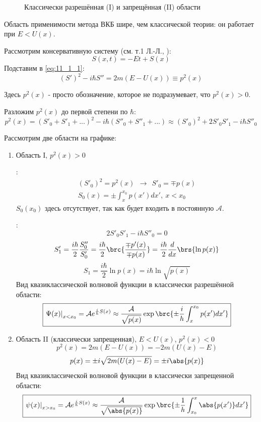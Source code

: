 \begin{figure}
\centering
{}
\caption{Классически разрешённая (I) и запрещённая (II) области} \label{fig:1}
\end{figure}

Область применимости метода ВКБ шире, чем классической теории: он работает при $E < U(x)$.

Рассмотрим консервативную систему (см. т.1 Л.-Л., ):
$$
S(x,t) = -Et + S(x)
$$
Подставим в \eqref{eq:11_1_1}:
$$
(S')^2 - i\hbar S'' = 2m(E-U(x)) \equiv p^2(x)
$$

Здесь $p^2(x)$ - просто обозначение, которое не подразумевает, что $p^2(x) > 0$.

Разложим $p^2(x)$ до первой степени по $\hbar$:
$$
p^2(x) = (S'_0 + S'_1 + ...)^2 - i\hbar(S''_0+S''_1+...) \approx (S'_0)^2 + 2 S'_0 S'_1 - i\hbar S''_0
$$

Рассмотрим две области на графике:
\renewcommand{\labelenumi}{(\alph{enumi})}
\begin{enumerate}
\item Область I, $p^2(x)>0$

:
$$
\begin{gathered}
(S'_0)^2 = p^2(x) ~~ \rightarrow~~ S'_0 = \mp p(x)\\
\boxed{S_0(x) = \pm \int_x^{x_0} p(x')dx',~ x<x_0}
\end{gathered}
$$
$S_0(x_0)$ здесь отсутствует, так как будет входить в постоянную $\mathcal{A}$.

:
$$
2 S'_0 S'_1 - i\hbar S''_0 = 0
$$
$$
S'_1 = \frac{i\hbar}{2} \frac{S''_0}{S'_0} = \frac{i\hbar}{2} \brc{\frac{\mp p'(x)}{\mp p(x)}} = \frac{i\hbar}{2} \frac{d}{dx}\brs{\ln p(x)}
$$
$$
S_1 = \frac{i\hbar}{2} \ln p(x) = \boxed{i\hbar \ln \sqrt{p(x)}}
$$
Вид квазиклассической волновой функции в классически разрешённой области:
$$
\boxed{\left. \Psi(x) \right|_{x<x_0} = \mathcal{A} e^{\frac{i}{h} S(x)} \approx \frac{\mathcal{A}}{\sqrt{p(x)}} \exp \brc{\pm\frac{i}{h}\int_x^{x_0} p(x')dx'} }
$$

\item Область II (классически запрещенная), $E<U(x)$, $p^2(x)<0$
$$
p^2(x) = 2m(E-U(x)) = -2m(U(x)-E)
$$
$$
p(x) = \pm i \sqrt{2m(U(x)-E)} = \pm i \abs{p(x)}
$$
Вид квазиклассической волновой функции в классически запрещенной области:
$$
\boxed{\left. \psi(x) \right|_{x>x_0} = \mathcal{A} e^{\frac{i}{h} S(x)} \approx \frac{\mathcal{A}}{\sqrt{\abs{p(x)}}} \exp \brc{\pm\frac{1}{h}\int_{x_0}^{x} \abs{p(x')}dx'} }
$$
\end{enumerate}

